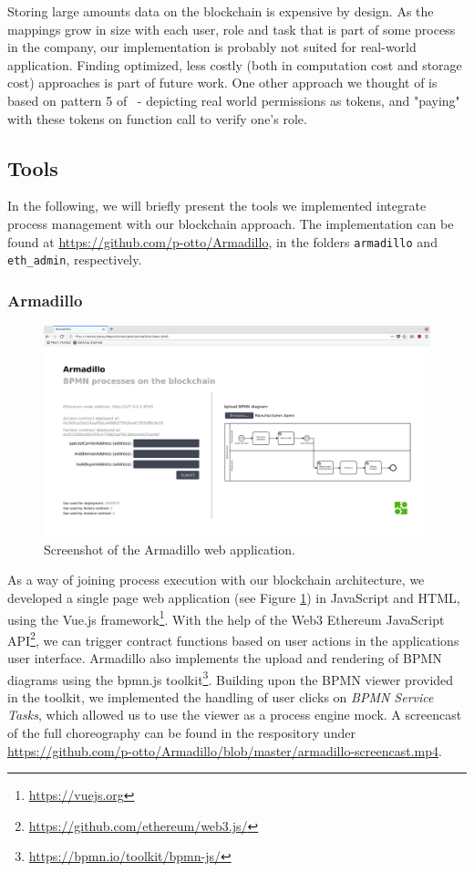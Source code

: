\documentclass[runningheads]{llncs}
\begin{document}
Storing large amounts data on the blockchain is expensive by design.
As the mappings grow in size with each user, role and task that is part of some process in the company, our implementation is probably not suited for real-world application.
Finding optimized, less costly (both in computation cost and storage cost) approaches is part of future work.
One other approach we thought of is based on pattern 5 of~\cite{xu2018pattern} - depicting real world permissions as tokens, and "paying" with these tokens on function call to verify one's role.

\subsection{Tools}

In the following, we will briefly present the tools we implemented integrate process management with our blockchain approach.
The implementation can be found at \url{https://github.com/p-otto/Armadillo}, in the folders \texttt{armadillo} and \texttt{eth\_admin}, respectively.

\subsubsection{Armadillo}

\begin{figure}
	\centering
\includegraphics[width=\textwidth]{fig/Armadillo.png}
\caption{Screenshot of the Armadillo web application.}
\label{fig:armadillo}
\end{figure}

As a way of joining process execution with our blockchain architecture, we developed a single page web application (see Figure \ref{fig:armadillo}) in JavaScript and HTML, using the Vue.js framework\footnote{\url{https://vuejs.org}}.
With the help of the Web3 Ethereum JavaScript API\footnote{\label{web3}\url{https://github.com/ethereum/web3.js/}}, we can trigger contract functions based on user actions in the applications user interface.
Armadillo also implements the upload and rendering of BPMN diagrams using the bpmn.js toolkit\footnote{\url{https://bpmn.io/toolkit/bpmn-js/}}.
Building upon the BPMN viewer provided in the toolkit, we implemented the handling of user clicks on \emph{BPMN Service Tasks}, which allowed us to use the viewer as a process engine mock.
A screencast of the full choreography can be found in the respository under \url{https://github.com/p-otto/Armadillo/blob/master/armadillo-screencast.mp4}.
\end{document}
